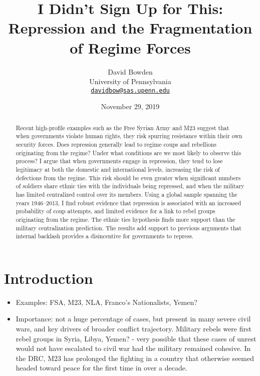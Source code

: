\documentclass[12pt,]{article}
\title{I Didn't Sign Up for This: Repression and the Fragmentation of Regime Forces}
\author{David Bowden\\
University of Pennsylvania\\
\href{mailto:davidbow@sas.upenn.edu}{\nolinkurl{davidbow@sas.upenn.edu}}}
\date{November 29, 2019}
\providecommand{\tightlist}{%
  \setlength{\itemsep}{0pt}\setlength{\parskip}{0pt}}
\begin{document}
\maketitle
\begin{abstract}
Recent high-profile examples such as the Free Syrian Army and M23 suggest that when governments violate human rights, they risk spurring resistance within their own security forces. Does repression generally lead to regime coups and rebellions originating from the regime? Under what conditions are we most likely to observe this process? I argue that when governments engage in repression, they tend to lose legitimacy at both the domestic and international levels, increasing the risk of defections from the regime. This risk should be even greater when significant numbers of soldiers share ethnic ties with the individuals being repressed, and when the military has limited centralized control over its members. Using a global sample spanning the years 1946--2013, I find robust evidence that repression is associated with an increased probability of coup attempts, and limited evidence for a link to rebel groups originating from the regime. The ethnic ties hypothesis finds more support than the military centralization prediction. The results add support to previous arguments that internal backlash provides a disincentive for governments to repress.
\end{abstract}

\doublespacing

\setlength{\parindent}{1cm}

\hypertarget{introduction}{%
\section{Introduction}\label{introduction}}

\begin{itemize}
\tightlist
\item
  Examples: FSA, M23, NLA, Franco's Nationalists, Yemen?
\item
  Importance: not a huge percentage of cases, but present in many severe civil wars, and key drivers of broader conflict trajectory. Military rebels were first rebel groups in Syria, Libya, Yemen? - very possible that these cases of unrest would not have escalated to civil war had the military remained cohesive. In the DRC, M23 has prolonged the fighting in a country that otherwise seemed headed toward peace for the first time in over a decade.
\end{itemize}
\end{document}
